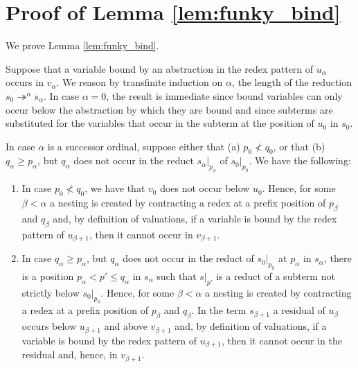 \documentclass{LMCS}
\theoremstyle{plain}
\theoremstyle{definition}
\newcommand{\trewt}{\twoheadrightarrow}
\begin{document}
\newpage

\appendix

\section{Proof of Lemma \ref{lem:funky_bind}}
\label{app:bound}

We prove Lemma \ref{lem:funky_bind}.

\proof
Suppose that a variable bound by an abstraction in the redex pattern of $u_\alpha$ occurs in $v_\alpha$. We reason by transfinite induction on $\alpha$, the length of the reduction $s_0 \trewt^\alpha s_\alpha$. In case $\alpha = 0$, the result is immediate since bound variables can only occur below the abstraction by which they are bound and since subterms are substituted for the variables that occur in the subterm at the position of $u_0$ in $s_0$.

In case $\alpha$ is a successor ordinal, suppose either that (a) $p_0 \not < q_0$, or that (b) $q_\alpha \geq p_\alpha$, but $q_\alpha$ 
does not occur in the reduct $s_\alpha \vert_{p_\alpha}$ of $s_0 \vert_{p_0}$. We have the following:

\begin{enumerate}[$\bullet$]
\item
In case $p_0 \not < q_0$, we have that $v_0$ does not occur below $u_0$. Hence, for some $\beta < \alpha$ a nesting is created by contracting a redex at a prefix position of $p_\beta$ and $q_\beta$ and, by definition of valuations, if a variable is bound by the redex pattern of $u_{\beta + 1}$, then it cannot occur in $v_{\beta + 1}$.

\item
In case $q_\alpha \geq p_\alpha$, but $q_\alpha$ does not occur in the reduct of $s_0|_{p_0}$ at $p_\alpha$ in $s_\alpha$, there is a position $p_\alpha < p' \leq q_\alpha$ in $s_\alpha$ such that $s|_{p'}$ is a reduct of a subterm not strictly below $s_0 \vert_{p_0}$. Hence, for some $\beta < \alpha$ a nesting is created by contracting a redex at a prefix position of $p_\beta$ and $q_\beta$. In the term $s_{\beta + 1}$ a residual of $u_\beta$ occurs below $u_{\beta + 1}$ and above $v_{\beta + 1}$ and, by definition of valuations, if a variable is bound by the redex pattern of $u_{\beta + 1}$, then it cannot occur in the residual and, hence, in $v_{\beta + 1}$. 
\end{enumerate}
\end{document}
